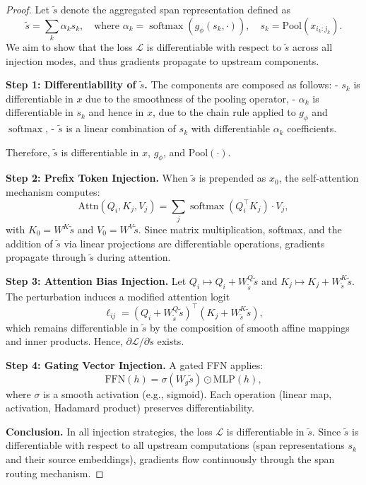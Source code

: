 \begin{proof}
Let $\tilde{s}$ denote the aggregated span representation defined as
\[
\tilde{s} = \sum_k \alpha_k s_k, \quad \text{where } \alpha_k = \operatorname{softmax}(g_\phi(s_k, \cdot)), \quad s_k = \mathrm{Pool}(x_{i_k:j_k}).
\]
We aim to show that the loss $\mathcal{L}$ is differentiable with respect to $\tilde{s}$ across all injection modes, and thus gradients propagate to upstream components.

\textbf{Step 1: Differentiability of $\tilde{s}$.}  
The components are composed as follows:
- $s_k$ is differentiable in $x$ due to the smoothness of the pooling operator,
- $\alpha_k$ is differentiable in $s_k$ and hence in $x$, due to the chain rule applied to $g_\phi$ and $\operatorname{softmax}$,
- $\tilde{s}$ is a linear combination of $s_k$ with differentiable $\alpha_k$ coefficients.

Therefore, $\tilde{s}$ is differentiable in $x$, $g_\phi$, and $\mathrm{Pool}(\cdot)$.

\textbf{Step 2: Prefix Token Injection.}  
When $\tilde{s}$ is prepended as $x_0$, the self-attention mechanism computes:
\[
\mathrm{Attn}(Q_i, K_j, V_j) = \sum_j \operatorname{softmax}(Q_i^\top K_j) \cdot V_j,
\]
with $K_0 = W^K \tilde{s}$ and $V_0 = W^V \tilde{s}$.  
Since matrix multiplication, softmax, and the addition of $\tilde{s}$ via linear projections are differentiable operations, gradients propagate through $\tilde{s}$ during attention.

\textbf{Step 3: Attention Bias Injection.}  
Let $Q_i \mapsto Q_i + W^Q_{\tilde{s}} \tilde{s}$ and $K_j \mapsto K_j + W^K_{\tilde{s}} \tilde{s}$.  
The perturbation induces a modified attention logit
\[
\ell_{ij} = (Q_i + W^Q_{\tilde{s}} \tilde{s})^\top (K_j + W^K_{\tilde{s}} \tilde{s}),
\]
which remains differentiable in $\tilde{s}$ by the composition of smooth affine mappings and inner products. Hence, $\partial \mathcal{L} / \partial \tilde{s}$ exists.

\textbf{Step 4: Gating Vector Injection.}  
A gated FFN applies:
\[
\mathrm{FFN}(h) = \sigma(W_g \tilde{s}) \odot \mathrm{MLP}(h),
\]
where $\sigma$ is a smooth activation (e.g., sigmoid). Each operation (linear map, activation, Hadamard product) preserves differentiability.

\textbf{Conclusion.}  
In all injection strategies, the loss $\mathcal{L}$ is differentiable in $\tilde{s}$. Since $\tilde{s}$ is differentiable with respect to all upstream computations (span representations $s_k$ and their source embeddings), gradients flow continuously through the span routing mechanism.  
\end{proof}

